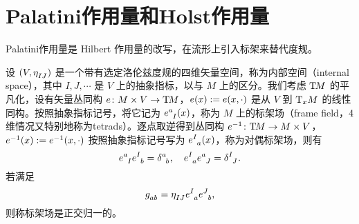 	
	
			
	

	\section{Palatini作用量和Holst作用量}

		Palatini作用量是 Hilbert 作用量的改写，在流形上引入标架来替代度规。\cite{Baez1994,Ashtekar2004}

		设 $\left( V, \tensor{\eta}{_I_J} \right)$ 是一个带有选定洛伦兹度规的四维矢量空间，称为内部空间（internal space），其中 $I,J,\cdots$ 是 $V$ 上的抽象指标，以与 $M$ 上的区分。我们考虑 $\TB{M}$ 的平凡化，设有矢量丛同构 $e \colon M \times V \rightarrow \TB{M}$，$e(x) \definedby e(x,\cdot)$ 是从 $V$ 到 $\TBx[x]{M}$ 的线性同构。按照抽象指标记号，将它记为 $\tensor{e}{^a_I}(x)$，称为 $M$ 上的标架场（frame field，4维情况又特别地称为tetrads）。逐点取逆得到丛同构 $e^{-1} \colon \TB{M} \rightarrow M \times V$，$e^{-1}(x) \definedby e^{-1}(x,\cdot)$ 按照抽象指标记号写为 $\tensor{e}{^I_a}(x)$，称为对偶标架场，则有
		\begin{equation}
			\tensor{e}{^a_I} \tensor{e}{^I_b} = \tensor{\delta}{^a_b} \qc \tensor{e}{^I_a} \tensor{e}{^a_J} = \tensor{\delta}{^I_J}.
		\end{equation}
		若满足
		\begin{equation}
			\tensor{g}{_a_b} = \tensor{\eta}{_I_J} \tensor{e}{^I_a} \tensor{e}{^J_b},
		\end{equation}
		则称标架场是正交归一的。


